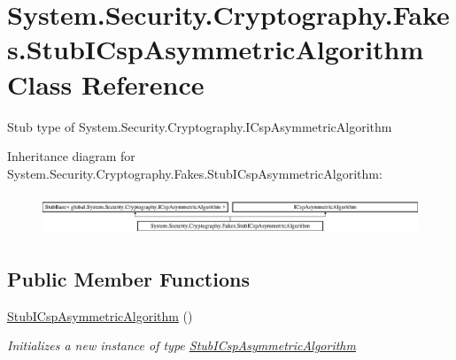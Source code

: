 \hypertarget{class_system_1_1_security_1_1_cryptography_1_1_fakes_1_1_stub_i_csp_asymmetric_algorithm}{\section{System.\-Security.\-Cryptography.\-Fakes.\-Stub\-I\-Csp\-Asymmetric\-Algorithm Class Reference}
\label{class_system_1_1_security_1_1_cryptography_1_1_fakes_1_1_stub_i_csp_asymmetric_algorithm}
}


Stub type of System.\-Security.\-Cryptography.\-I\-Csp\-Asymmetric\-Algorithm 


Inheritance diagram for System.\-Security.\-Cryptography.\-Fakes.\-Stub\-I\-Csp\-Asymmetric\-Algorithm\-:\begin{figure}[H]
\begin{center}
\leavevmode
\includegraphics[height=1.230769cm]{class_system_1_1_security_1_1_cryptography_1_1_fakes_1_1_stub_i_csp_asymmetric_algorithm}
\end{center}
\end{figure}
\subsection*{Public Member Functions}
\begin{DoxyCompactItemize}
\item 
\hyperlink{class_system_1_1_security_1_1_cryptography_1_1_fakes_1_1_stub_i_csp_asymmetric_algorithm_accee3e91f1ce8c7ab56c6d31fb430f72}{Stub\-I\-Csp\-Asymmetric\-Algorithm} ()
\begin{DoxyCompactList}\small\item\em Initializes a new instance of type \hyperlink{class_system_1_1_security_1_1_cryptography_1_1_fakes_1_1_stub_i_csp_asymmetric_algorithm}{Stub\-I\-Csp\-Asymmetric\-Algorithm}\end{DoxyCompactList}\end{DoxyCompactItemize}
